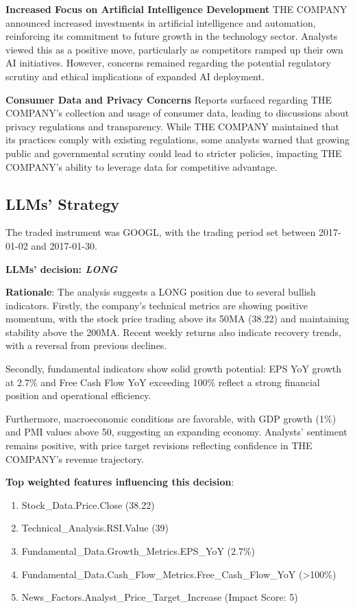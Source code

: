 \documentclass[8pt]{scrartcl}
\begin{document}
\textbf{Increased Focus on Artificial Intelligence Development}
THE COMPANY announced increased investments in artificial intelligence and automation, reinforcing its commitment to future growth in the technology sector. Analysts viewed this as a positive move, particularly as competitors ramped up their own AI initiatives. However, concerns remained regarding the potential regulatory scrutiny and ethical implications of expanded AI deployment.

\textbf{Consumer Data and Privacy Concerns}
Reports surfaced regarding THE COMPANY's collection and usage of consumer data, leading to discussions about privacy regulations and transparency. While THE COMPANY maintained that its practices comply with existing regulations, some analysts warned that growing public and governmental scrutiny could lead to stricter policies, impacting THE COMPANY’s ability to leverage data for competitive advantage.

\newpage

\subsection*{LLMs' Strategy} \label{strategy8}

The traded instrument was GOOGL, with the trading period set between 2017-01-02 and 2017-01-30.

\textbf{LLMs' decision: \textit{LONG}}

\textbf{Rationale}: The analysis suggests a LONG position due to several bullish indicators. Firstly, the company’s technical metrics are showing positive momentum, with the stock price trading above its 50MA (38.22) and maintaining stability above the 200MA. Recent weekly returns also indicate recovery trends, with a reversal from previous declines.

Secondly, fundamental indicators show solid growth potential: EPS YoY growth at 2.7\% and Free Cash Flow YoY exceeding 100\% reflect a strong financial position and operational efficiency.

Furthermore, macroeconomic conditions are favorable, with GDP growth (1\%) and PMI values above 50, suggesting an expanding economy. Analysts’ sentiment remains positive, with price target revisions reflecting confidence in THE COMPANY’s revenue trajectory.

\textbf{Top weighted features influencing this decision}:
\begin{enumerate}
    \item Stock\_Data.Price.Close (38.22)
    \item Technical\_Analysis.RSI.Value (39)
    \item Fundamental\_Data.Growth\_Metrics.EPS\_YoY (2.7\%)
    \item Fundamental\_Data.Cash\_Flow\_Metrics.Free\_Cash\_Flow\_YoY (>100\%)
    \item News_Factors.Analyst\_Price\_Target\_Increase (Impact Score: 5)
\end{enumerate}
\end{document}
